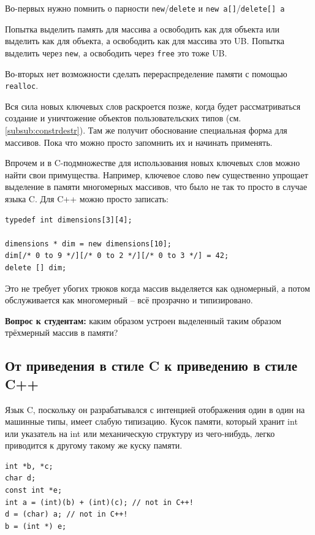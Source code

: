 \documentclass[a4paper,12pt,oneside]{book}
\newif\ifanswers
\begin{document}
Во-первых нужно помнить о парности \lstinline!new!/\lstinline!delete! и \lstinline!new a[]!/\lstinline!delete[] a!

Попытка выделить память для массива а освободить как для объекта или выделить как для объекта, а освободить как для массива это UB. Попытка выделить через \lstinline!new!, а освободить через \lstinline!free! это тоже UB.

Во-вторых нет возможности сделать перераспределение памяти с помощью \lstinline!realloc!.

Вся сила новых ключевых слов раскроется позже, когда будет рассматриваться создание и уничтожение объектов пользовательских типов (см. \ref{subsub:constrdestr}). Там же получит обоснование специальная форма для массивов. Пока что можно просто запомнить их и начинать применять.

Впрочем и в C-подмножестве для использования новых ключевых слов можно найти свои примущества. Например, ключевое слово \lstinline!new! существенно упрощает выделение в памяти многомерных массивов, что было не так то просто в случае языка C. Для C++ можно просто записать:

\begin{lstlisting}
typedef int dimensions[3][4];

dimensions * dim = new dimensions[10];
dim[/* 0 to 9 */][/* 0 to 2 */][/* 0 to 3 */] = 42;
delete [] dim;
\end{lstlisting}

Это не требует убогих трюков когда массив выделяется как одномерный, а потом обслуживается как многомерный -- всё прозрачно и типизировано.

\textbf{Вопрос к студентам:} каким образом устроен выделенный таким образом трёхмерный массив в памяти?

\ifanswers
Правильный ответ: это jagged-вектор из одномерных массивов с двумерным доступом к каждому
\fi

\subsection{От приведения в стиле C к приведению в стиле C++}\label{FromCCastToCPP}

Язык C, поскольку он разрабатывался с интенцией отображения один в один на машинные типы, имеет слабую типизацию. Кусок памяти, который хранит int или указатель на int или механическую структуру из чего-нибудь, легко приводится к другому такому же куску памяти.

\begin{lstlisting}
int *b, *c;
char d;
const int *e;
int a = (int)(b) + (int)(c); // not in C++! 
d = (char) a; // not in C++! 
b = (int *) e;
\end{lstlisting}
\end{document}
